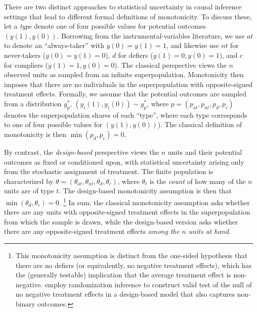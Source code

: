 \documentclass[12pt,reqno]{amsart}
\begin{document}
There are two distinct approaches to statistical uncertainty in causal inference settings
that lead to different formal definitions of monotonicity. To discuss these, let a \emph{type} denote one of four possible values for potential outcomes $(y(1), y(0))$. Borrowing
from the instrumental-variables literature, we use $at$ to denote an ``always-taker'' with
$y(0)=y(1)=1$, and likewise use $nt$ for never-takers ($y(0)=y(1)=0$), $d$ for defiers ($y(1)=0,y(0)=1$), and $c$ for compliers
($y(1)=1,y(0)=0$). 
The classical perspective views
the $n$ observed units as sampled from an infinite superpopulation. Monotonicity then
imposes that there are no individuals in the superpopulation with opposite-signed
treatment effects. Formally, we assume that the potential outcomes are sampled from a
distribution $g^*_p$, $(y_i(1),y_i(0)) \sim g^*_p$, where $p =
(p_{at},p_{nt},p_{d},p_{c})$ denotes the superpopulation shares of each ``type'', where
each type corresponds to one of four possible values for $(y(1), y(0))$). 
The classical definition of
monotonicity is then $\min(p_d,p_c) =0$.

By contrast, the \emph{design-based} perspective views the $n$ units and their potential
outcomes as {fixed} or conditioned upon, with statistical uncertainty arising only from
the stochastic assignment of treatment. The finite population is characterized by $\theta = (\theta_{at}, \theta_{nt}, \theta_{d}, \theta_{c})$, where $\theta_t$ is the
\emph{count} of how many of the $n$ units are of type $t$. The design-based monotonicity
assumption is then that $\min(\theta_d,\theta_c) = 0$.%
\footnote{This monotonicity assumption is distinct from the one-sided hypothesis that there are no defiers (or equivalently, no negative treatment effects), which has the (generally testable) implication that the average treatment effect is non-negative. \cite{caughey2023randomisation}  employ randomization inference to construct valid test of the null of no negative treatment effects in a design-based model that also captures non-binary outcomes.}
In sum, the classical
monotonicity assumption asks whether there are any units with opposite-signed treatment
effects in the superpopulation from which the sample is drawn, while the design-based
version asks whether there are any opposite-signed treatment effects \emph{among the $n$
units at hand}.
\end{document}
